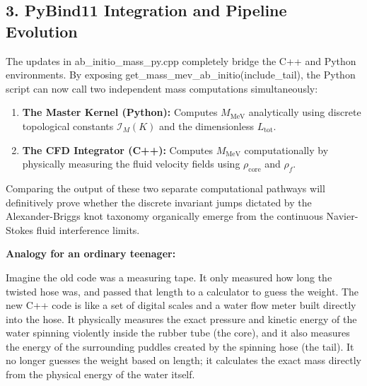 \documentclass[11pt]{article}
\begin{document}
\subsection*{3. PyBind11 Integration and Pipeline Evolution}
The updates in ab_initio_mass_py.cpp completely bridge the C++ and Python environments. By exposing get_mass_mev_ab_initio(include_tail), the Python script can now call two independent mass computations simultaneously:

\begin{enumerate}
\item \textbf{The Master Kernel (Python):} Computes $M_{\text{MeV}}$ analytically using discrete topological constants $\mathcal{I}_M(K)$ and the dimensionless $L_{\text{tot}}$.


\item \textbf{The CFD Integrator (C++):} Computes $M_{\text{MeV}}$ computationally by physically measuring the fluid velocity fields using $\rho_{\text{core}}$ and $\rho_{\!f}$.


\end{enumerate}
Comparing the output of these two separate computational pathways will definitively prove whether the discrete invariant jumps dictated by the Alexander-Briggs knot taxonomy organically emerge from the continuous Navier-Stokes fluid interference limits.

\textbf{Analogy for an ordinary teenager:}

Imagine the old code was a measuring tape. It only measured how long the twisted hose was, and passed that length to a calculator to guess the weight. The new C++ code is like a set of digital scales and a water flow meter built directly into the hose. It physically measures the exact pressure and kinetic energy of the water spinning violently inside the rubber tube (the core), and it also measures the energy of the surrounding puddles created by the spinning hose (the tail). It no longer guesses the weight based on length; it calculates the exact mass directly from the physical energy of the water itself.
\end{document}

